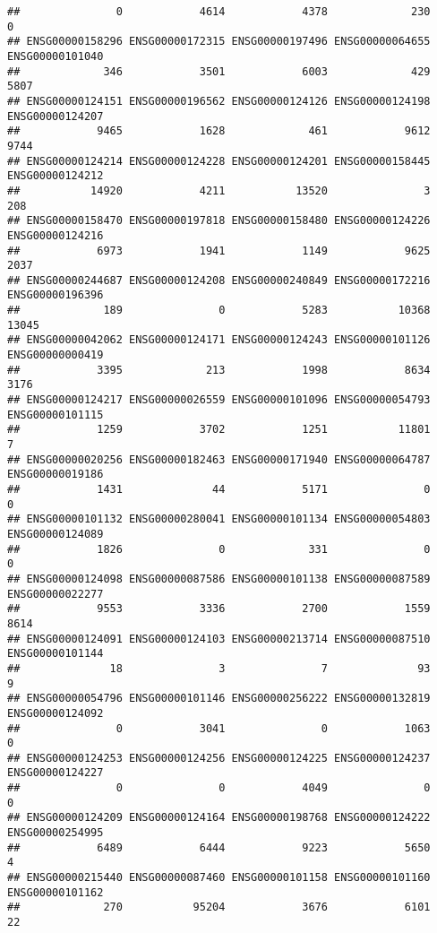 \documentclass[
]{article}
\begin{document}
\begin{verbatim}
##               0            4614            4378             230               0 
## ENSG00000158296 ENSG00000172315 ENSG00000197496 ENSG00000064655 ENSG00000101040 
##             346            3501            6003             429            5807 
## ENSG00000124151 ENSG00000196562 ENSG00000124126 ENSG00000124198 ENSG00000124207 
##            9465            1628             461            9612            9744 
## ENSG00000124214 ENSG00000124228 ENSG00000124201 ENSG00000158445 ENSG00000124212 
##           14920            4211           13520               3             208 
## ENSG00000158470 ENSG00000197818 ENSG00000158480 ENSG00000124226 ENSG00000124216 
##            6973            1941            1149            9625            2037 
## ENSG00000244687 ENSG00000124208 ENSG00000240849 ENSG00000172216 ENSG00000196396 
##             189               0            5283           10368           13045 
## ENSG00000042062 ENSG00000124171 ENSG00000124243 ENSG00000101126 ENSG00000000419 
##            3395             213            1998            8634            3176 
## ENSG00000124217 ENSG00000026559 ENSG00000101096 ENSG00000054793 ENSG00000101115 
##            1259            3702            1251           11801               7 
## ENSG00000020256 ENSG00000182463 ENSG00000171940 ENSG00000064787 ENSG00000019186 
##            1431              44            5171               0               0 
## ENSG00000101132 ENSG00000280041 ENSG00000101134 ENSG00000054803 ENSG00000124089 
##            1826               0             331               0               0 
## ENSG00000124098 ENSG00000087586 ENSG00000101138 ENSG00000087589 ENSG00000022277 
##            9553            3336            2700            1559            8614 
## ENSG00000124091 ENSG00000124103 ENSG00000213714 ENSG00000087510 ENSG00000101144 
##              18               3               7              93               9 
## ENSG00000054796 ENSG00000101146 ENSG00000256222 ENSG00000132819 ENSG00000124092 
##               0            3041               0            1063               0 
## ENSG00000124253 ENSG00000124256 ENSG00000124225 ENSG00000124237 ENSG00000124227 
##               0               0            4049               0               0 
## ENSG00000124209 ENSG00000124164 ENSG00000198768 ENSG00000124222 ENSG00000254995 
##            6489            6444            9223            5650               4 
## ENSG00000215440 ENSG00000087460 ENSG00000101158 ENSG00000101160 ENSG00000101162 
##             270           95204            3676            6101              22 

\end{verbatim}
\end{document}
